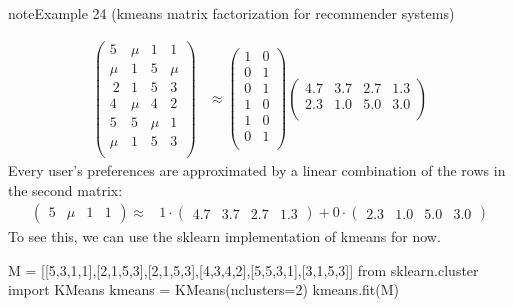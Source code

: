 \documentclass[letterpaper,10pt,english]{jupyterBook}
\begin{document}
\begin{sphinxadmonition}{note}{Example 24 (k\sphinxhyphen{}means matrix factorization for recommender systems)}


\label{equation:clustering_k_means_mf:e70e62e5-9203-4789-a508-44f80e040b0f}\begin{align}
  \begin{pmatrix}
    5 & \mu & 1 & 1 \\
    \mu & 1 & 5 & \mu  \\\
    2 & 1 & 5 & 3 \\
    4 & \mu & 4 & 2\\
    5 & 5 & \mu & 1 \\
    \mu & 1 & 5 & 3 \\
  \end{pmatrix}
  &\approx
  \begin{pmatrix}
    1 & 0\\
    0 & 1\\
    0 & 1\\
    1 & 0\\
    1 & 0\\
    0 & 1\\
  \end{pmatrix}
  \begin{pmatrix}
    4.7 & 3.7 & 2.7 & 1.3\\
    2.3 & 1.0 & 5.0 & 3.0\\
  \end{pmatrix}
\end{align}
\sphinxAtStartPar
Every user’s preferences are approximated by a linear combination of the rows in the second matrix:
\label{equation:clustering_k_means_mf:a8a54392-04e7-442b-924f-e202cfaa5f8e}\begin{align}
    \begin{pmatrix}
        5 & \mu & 1 & 1 
    \end{pmatrix}
    \approx&
    1\cdot 
    \begin{pmatrix}
        4.7 & 3.7 & 2.7 & 1.3
    \end{pmatrix}
    +0\cdot
    \begin{pmatrix}
        2.3 & 1.0 & 5.0 & 3.0
    \end{pmatrix}    
\end{align}
\sphinxAtStartPar
To see this, we can use the sklearn implementation of k\sphinxhyphen{}means for now.

\begin{sphinxVerbatim}[commandchars=\\\{\}]
M = [[5,3,1,1],[2,1,5,3],[2,1,5,3],[4,3,4,2],[5,5,3,1],[3,1,5,3]]
from sklearn.cluster import KMeans
kmeans = KMeans(n\PYGZus{}clusters=2)
kmeans.fit(M)
\end{sphinxVerbatim}


\end{sphinxadmonition}
\end{document}
